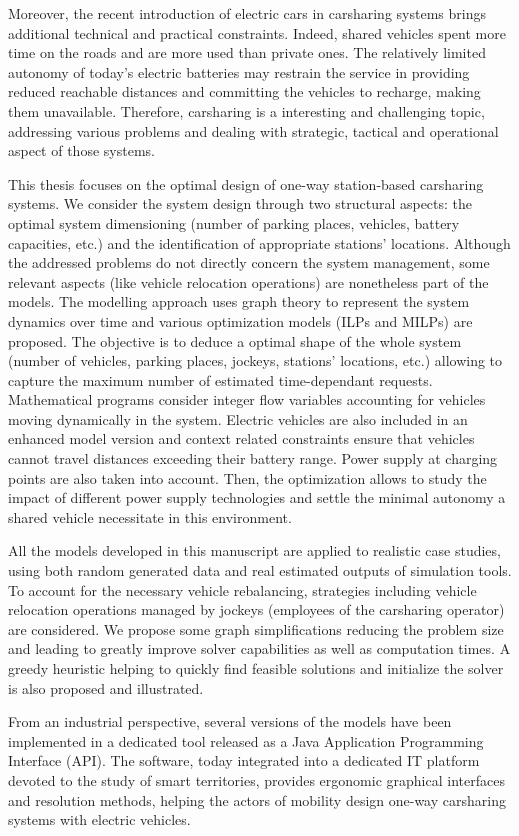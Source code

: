 \medskip
Moreover, the recent introduction of electric cars in carsharing systems brings additional technical and practical constraints.
Indeed, shared vehicles spent more time on the roads and are more used than private ones.
The relatively limited autonomy of today's electric batteries may restrain the service in providing  reduced reachable distances and committing the vehicles to recharge, making them unavailable.
Therefore, carsharing is a interesting and challenging topic, addressing various problems and dealing with strategic, tactical and operational aspect of those systems.

\medskip
This thesis focuses on the optimal design of one-way station-based carsharing systems.
We consider the system design through two structural aspects: the optimal system dimensioning (number of parking places, vehicles, battery capacities, etc.) and the identification of appropriate stations' locations.
Although the addressed problems do not directly concern the system management, some relevant aspects (like vehicle relocation operations) are nonetheless part of the models.
The modelling approach uses graph theory to represent the system dynamics over time and various optimization models (ILPs and MILPs) are proposed.
The objective is to deduce a optimal shape of the whole system (number of vehicles, parking places, jockeys, stations' locations, etc.) allowing to capture the maximum number of estimated time-dependant requests.
Mathematical programs consider integer flow variables accounting for vehicles moving dynamically in the system.
Electric vehicles are also included in an enhanced model version and context related constraints ensure that vehicles cannot travel distances exceeding their battery range.
Power supply at charging points are also taken into account.
Then, the optimization allows to study the impact of different power supply technologies and settle the minimal autonomy a shared vehicle necessitate in this environment.

\medskip
All the models developed in this manuscript are applied to realistic case studies, using both random generated data and real estimated outputs of simulation tools.
To account for the necessary vehicle rebalancing, strategies including vehicle relocation operations managed by jockeys (employees of the carsharing operator) are considered.
We propose some graph simplifications reducing the problem size and leading to greatly improve solver capabilities as well as computation times.
A greedy heuristic helping to quickly find feasible solutions and initialize the solver is also proposed and illustrated.

\medskip
From an industrial perspective, several versions of the models have been implemented in a dedicated tool released as a Java Application Programming Interface (API).
The software, today  integrated into a dedicated IT platform devoted to the study of smart territories, provides ergonomic graphical interfaces and resolution methods, helping the actors of mobility design one-way carsharing systems with electric vehicles.
